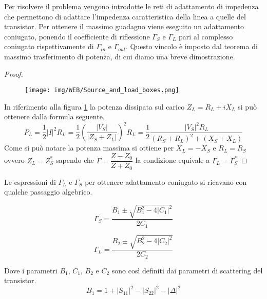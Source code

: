 \documentclass[12pt,oneside]{book}
\begin{document}
Per risolvere il problema vengono introdotte le reti di adattamento di impedenza che permettono di adattare l'impedenza caratteristica della linea a quelle del transistor. Per ottenere il massimo guadagno viene eseguito un adattamento coniugato, ponendo il coefficiente di riflessione $\Gamma_{S}$ e $\Gamma_{L}$ pari al complesso coniugato rispettivamente di $\Gamma_{in}$ e $\Gamma_{out}$. Questo vincolo è imposto dal teorema di massimo trasferimento di potenza, di cui diamo una breve dimostrazione.

\begin{proof}
    \begin{figure}[!htbp]
        \centering
            \texttt{[image: img/WEB/Source\_and\_load\_boxes.png]}
            \caption{}
            \label{pwr_transfer}
    \end{figure}
    
    
    In riferimento alla figura \ref{pwr_transfer} la potenza dissipata sul carico $Z_L=R_L+iX_L$ si può ottenere dalla formula seguente.
    \begin{equation}
        P_L=\dfrac{1}{2}\left|I\right|^2 R_L = \dfrac{1}{2}\left(\dfrac{\left|V_S\right|}{\left|Z_S+Z_L\right|}\right)^2 R_L = \dfrac{1}{2}\dfrac{\left|V_S\right|^2 R_L}{\left(R_S+R_L\right)^2+\left(X_S+X_L\right)}
    \end{equation}
    Come si può notare la potenza massima si ottiene per $X_L=-X_S$ e $R_L=R_S$ ovvero $Z_L=Z_S^*$ sapendo che $\Gamma=\dfrac{Z-Z_0}{Z+Z_0}$ la condizione equivale a $\Gamma_L=\Gamma_S^*$
\end{proof}




Le espressioni di $\Gamma_{L}$ e $\Gamma_{S}$ per ottenere adattamento coniugato si ricavano con qualche passaggio algebrico.

\begin{equation}
    \Gamma_{S}=\dfrac{B_{1}\pm\sqrt{B_{1}^2-4\left|C_{1}\right|^2}}{2C_{1}}
\end{equation}

\begin{equation}
    \Gamma_{L}=\dfrac{B_{2}\pm\sqrt{B_{2}^2-4\left|C_{2}\right|^2}}{2C_{2}}
\end{equation}

Dove i parametri $B_{1}$, $C_{1}$, $B_{2}$ e $C_{2}$ sono così definiti dai parametri di scattering del transistor.
\begin{equation}
    B_{1} = 1 + \left|S_{11}\right|^{2} - \left|S_{22}\right|^{2} -\left|\Delta\right|^{2}
\end{equation}
\end{document}
